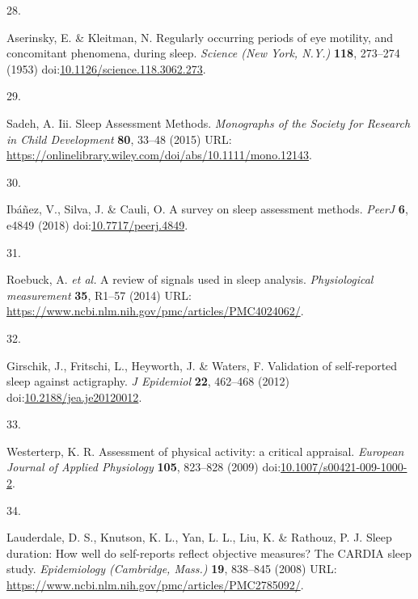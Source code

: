 \documentclass[
  9pt,
]{scrbook}
\newlength{\cslhangindent}
\newlength{\csllabelwidth}
\newlength{\cslentryspacingunit} %
\newenvironment{CSLReferences}[2] %
 {%
  \setlength{\parindent}{0pt}
  \ifodd #1
  \let\oldpar\par
  \def\par{\hangindent=\cslhangindent\oldpar}
  \fi
  \setlength{\parskip}{#2\cslentryspacingunit}
 }%
 {}
\newcommand{\CSLLeftMargin}[1]{\parbox[t]{\csllabelwidth}{#1}}
\newcommand{\CSLRightInline}[1]{\parbox[t]{\linewidth - \csllabelwidth}{#1}\break}
\begin{document}
\begin{CSLReferences}{0}{0}
\leavevmode{}%
\CSLLeftMargin{28. }%
\CSLRightInline{Aserinsky, E. \& Kleitman, N. Regularly occurring
periods of eye motility, and concomitant phenomena, during sleep.
\emph{Science (New York, N.Y.)} \textbf{118}, 273--274 (1953)
doi:\href{https://doi.org/10.1126/science.118.3062.273}{10.1126/science.118.3062.273}.}

\leavevmode{}%
\CSLLeftMargin{29. }%
\CSLRightInline{Sadeh, A. Iii. Sleep Assessment Methods.
\emph{Monographs of the Society for Research in Child Development}
\textbf{80}, 33--48 (2015) URL:
\url{https://onlinelibrary.wiley.com/doi/abs/10.1111/mono.12143}.}

\leavevmode{}%
\CSLLeftMargin{30. }%
\CSLRightInline{Ibáñez, V., Silva, J. \& Cauli, O. A survey on sleep
assessment methods. \emph{PeerJ} \textbf{6}, e4849 (2018)
doi:\href{https://doi.org/10.7717/peerj.4849}{10.7717/peerj.4849}.}

\leavevmode{}%
\CSLLeftMargin{31. }%
\CSLRightInline{Roebuck, A. \emph{et al.} A review of signals used in
sleep analysis. \emph{Physiological measurement} \textbf{35}, R1--57
(2014) URL:
\url{https://www.ncbi.nlm.nih.gov/pmc/articles/PMC4024062/}.}

\leavevmode{}%
\CSLLeftMargin{32. }%
\CSLRightInline{Girschik, J., Fritschi, L., Heyworth, J. \& Waters, F.
Validation of self-reported sleep against actigraphy. \emph{J Epidemiol}
\textbf{22}, 462--468 (2012)
doi:\href{https://doi.org/10.2188/jea.je20120012}{10.2188/jea.je20120012}.}

\leavevmode{}%
\CSLLeftMargin{33. }%
\CSLRightInline{Westerterp, K. R. Assessment of physical activity: a
critical appraisal. \emph{European Journal of Applied Physiology}
\textbf{105}, 823--828 (2009)
doi:\href{https://doi.org/10.1007/s00421-009-1000-2}{10.1007/s00421-009-1000-2}.}

\leavevmode{}%
\CSLLeftMargin{34. }%
\CSLRightInline{Lauderdale, D. S., Knutson, K. L., Yan, L. L., Liu, K.
\& Rathouz, P. J. Sleep duration: How well do self-reports reflect
objective measures? The CARDIA sleep study. \emph{Epidemiology
(Cambridge, Mass.)} \textbf{19}, 838--845 (2008) URL:
\url{https://www.ncbi.nlm.nih.gov/pmc/articles/PMC2785092/}.}


\end{CSLReferences}
\end{document}
